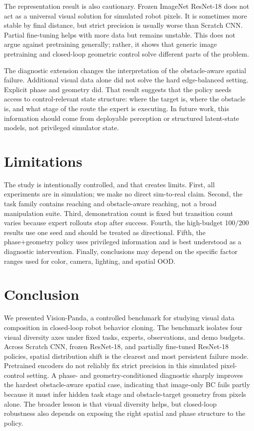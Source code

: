 \documentclass[10pt,twocolumn,letterpaper]{article}
\newcommand{\method}{Vision-Panda}
\begin{document}
The representation result is also cautionary. Frozen ImageNet ResNet-18 does not act as a universal visual solution for simulated robot pixels. It is sometimes more stable by final distance, but strict precision is usually worse than Scratch CNN. Partial fine-tuning helps with more data but remains unstable. This does not argue against pretraining generally; rather, it shows that generic image pretraining and closed-loop geometric control solve different parts of the problem.

The diagnostic extension changes the interpretation of the obstacle-aware spatial failure. Additional visual data alone did not solve the hard edge-balanced setting. Explicit phase and geometry did. That result suggests that the policy needs access to control-relevant state structure: where the target is, where the obstacle is, and what stage of the route the expert is executing. In future work, this information should come from deployable perception or structured latent-state models, not privileged simulator state.

\section{Limitations}
The study is intentionally controlled, and that creates limits. First, all experiments are in simulation; we make no direct sim-to-real claim. Second, the task family contains reaching and obstacle-aware reaching, not a broad manipulation suite. Third, demonstration count is fixed but transition count varies because expert rollouts stop after success. Fourth, the high-budget 100/200 results use one seed and should be treated as directional. Fifth, the phase+geometry policy uses privileged information and is best understood as a diagnostic intervention. Finally, conclusions may depend on the specific factor ranges used for color, camera, lighting, and spatial OOD.

\section{Conclusion}
We presented \method{}, a controlled benchmark for studying visual data composition in closed-loop robot behavior cloning. The benchmark isolates four visual diversity axes under fixed tasks, experts, observations, and demo budgets. Across Scratch CNN, frozen ResNet-18, and partially fine-tuned ResNet-18 policies, spatial distribution shift is the clearest and most persistent failure mode. Pretrained encoders do not reliably fix strict precision in this simulated pixel-control setting. A phase- and geometry-conditioned diagnostic sharply improves the hardest obstacle-aware spatial case, indicating that image-only BC fails partly because it must infer hidden task stage and obstacle-target geometry from pixels alone. The broader lesson is that visual diversity helps, but closed-loop robustness also depends on exposing the right spatial and phase structure to the policy.
\end{document}
